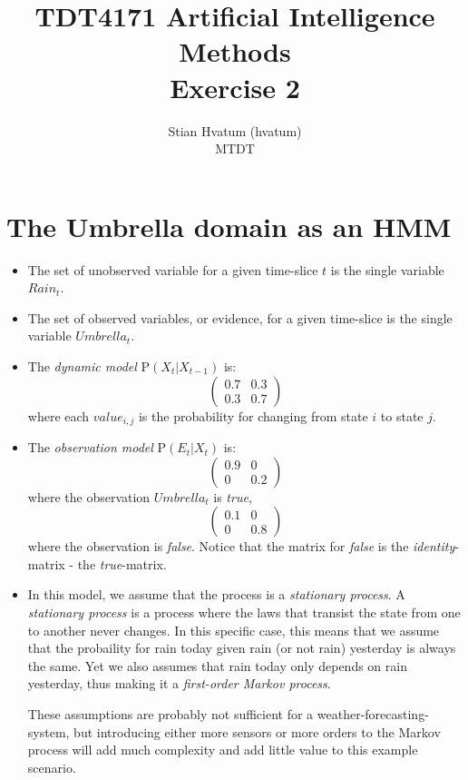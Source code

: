 \documentclass[english]{article}
\title{TDT4171 Artificial Intelligence Methods\\
\Huge Exercise 2}
\author{Stian Hvatum (hvatum)\\MTDT}
\begin{document}
\maketitle
{}
\section{The Umbrella domain as an HMM}
\begin{itemize}
  \item The set of unobserved variable for a given time-slice \(t\) is the single variable \(Rain_t\).
  \item The set of observed variables, or evidence, for a given time-slice is the single variable \(Umbrella_t\).
  \item The \emph{dynamic model} P\((X_t|X_{t-1})\) is:
\[ \left(
   \begin{array}{cc}
    0.7 & 0.3 \\
	0.3 & 0.7
	\end{array}
\right)\] 
where each \(value_{i,j}\) is the probability for changing from state \(i\) to
state \(j\).
  \item The \emph{observation model} P\((E_t|X_t)\) is:
\[ \left(
   \begin{array}{cc}
    0.9 & 0 \\
	0 & 0.2
	\end{array}
\right)\]
where the observation \(Umbrella_t\) is \emph{true},  
\[ \left(
   \begin{array}{cc}
    0.1 & 0 \\
	0 & 0.8
	\end{array}
\right)\] 
where the observation is \emph{false}. Notice that the matrix for \emph{false}
is the \emph{identity}-matrix - the \emph{true}-matrix.

\item In this model, we assume that the process is a \emph{stationary process}.
A \emph{stationary process} is a process where the laws that transist the state
from one to another never changes. In this specific case, this means that we
assume that the probaility for rain today given rain (or not rain) yesterday is
always the same. Yet we also assumes that rain today only depends on rain
yesterday, thus making it a \emph{first-order Markov process}.

These assumptions are probably not sufficient for a weather-forecasting-system,
but introducing either more sensors or more orders to the Markov process will
add much complexity and add little value to this example scenario.
\end{itemize}
\end{document}
